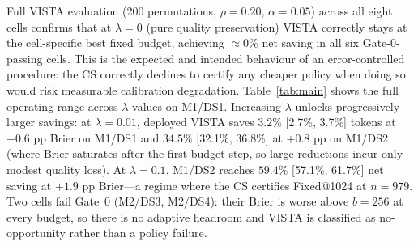 \documentclass[a4paper,fleqn]{cas-sc}
\theoremstyle{plain}
\theoremstyle{definition}
\theoremstyle{remark}
\begin{document}
Full VISTA evaluation (200 permutations, $\rho{=}0.20$, $\alpha{=}0.05$)
across all eight cells confirms that at $\lambda{=}0$ (pure quality preservation)
VISTA correctly stays at the cell-specific best fixed budget, achieving $\approx 0\%$
net saving in all six Gate-0-passing cells.
This is the expected and intended behaviour of an error-controlled procedure:
the CS correctly declines to certify any cheaper policy when doing so would
risk measurable calibration degradation.
Table~\ref{tab:main} shows the full operating range across $\lambda$ values on M1/DS1.
Increasing $\lambda$ unlocks progressively larger savings: at $\lambda{=}0.01$,
deployed VISTA saves $3.2\%$ [2.7\%, 3.7\%] tokens at $+0.6$ pp Brier on M1/DS1
and $34.5\%$ [32.1\%, 36.8\%] at $+0.8$ pp on M1/DS2 (where Brier saturates
after the first budget step, so large reductions incur only modest quality loss).
At $\lambda{=}0.1$, M1/DS2 reaches $59.4\%$ [57.1\%, 61.7\%] net saving
at $+1.9$ pp Brier---a regime where the CS certifies Fixed@1024 at $n{=}979$.
Two cells fail Gate~0 (M2/DS3, M2/DS4): their Brier is worse above $b{=}256$
at every budget, so there is no adaptive headroom and VISTA is classified as
no-opportunity rather than a policy failure.
\end{document}
